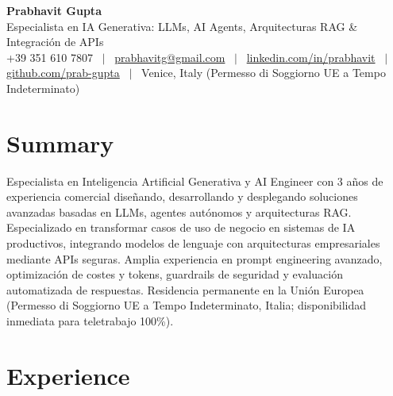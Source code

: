 \documentclass[a4paper,10pt]{article}
\begin{document}
\begin{minipage}[c]{0.80\textwidth}
  {\Huge\bfseries Prabhavit Gupta}\\[3pt]
  {\color{accent}\large Especialista en IA Generativa: LLMs, AI Agents, Arquitecturas RAG \& Integración de APIs}\\[6pt]
  {\footnotesize +39 351 610 7807 ~$\vert$~
  \href{mailto:prabhavitg@gmail.com}{prabhavitg@gmail.com} ~$\vert$~
  \href{https://www.linkedin.com/in/prabhavit/}{linkedin.com/in/prabhavit} ~$\vert$~
  \href{https://github.com/prab-gupta}{github.com/prab-gupta} ~$\vert$~
  Venice, Italy (Permesso di Soggiorno UE a Tempo Indeterminato)}
\end{minipage}\hfill

\section{Summary}
Especialista en Inteligencia Artificial Generativa y AI Engineer con 3 años de experiencia comercial diseñando, desarrollando y desplegando soluciones avanzadas basadas en LLMs, agentes autónomos y arquitecturas RAG. Especializado en transformar casos de uso de negocio en sistemas de IA productivos, integrando modelos de lenguaje con arquitecturas empresariales mediante APIs seguras. Amplia experiencia en prompt engineering avanzado, optimización de costes y tokens, guardrails de seguridad y evaluación automatizada de respuestas. Residencia permanente en la Unión Europea (Permesso di Soggiorno UE a Tempo Indeterminato, Italia; disponibilidad inmediata para teletrabajo 100\%).

\section{Experience}
\end{document}
